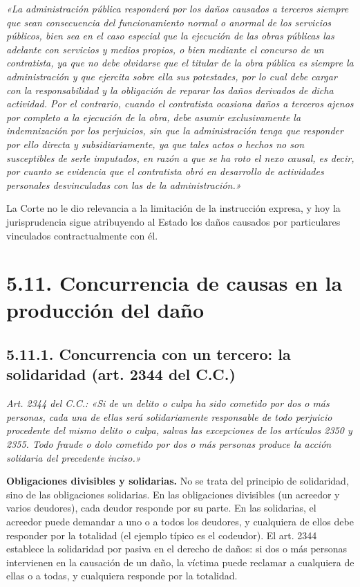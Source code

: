 \begin{cita}
\textit{«La administración pública responderá por los daños causados a terceros siempre que sean consecuencia del funcionamiento normal o anormal de los servicios públicos, bien sea en el caso especial que la ejecución de las obras públicas las adelante con servicios y medios propios, o bien mediante el concurso de un contratista, ya que no debe olvidarse que el titular de la obra pública es siempre la administración y que ejercita sobre ella sus potestades, por lo cual debe cargar con la responsabilidad y la obligación de reparar los daños derivados de dicha actividad. Por el contrario, cuando el contratista ocasiona daños a terceros ajenos por completo a la ejecución de la obra, debe asumir exclusivamente la indemnización por los perjuicios, sin que la administración tenga que responder por ello directa y subsidiariamente, ya que tales actos o hechos no son susceptibles de serle imputados, en razón a que se ha roto el nexo causal, es decir, por cuanto se evidencia que el contratista obró en desarrollo de actividades personales desvinculadas con las de la administración.»}
\end{cita}
La Corte no le dio relevancia a la limitación de la instrucción expresa, y hoy la jurisprudencia sigue atribuyendo al Estado los daños causados por particulares vinculados contractualmente con él.

\section{5.11. Concurrencia de causas en la producción del daño}
\subsection{5.11.1. Concurrencia con un tercero: la solidaridad (art. 2344 del C.C.)}
\begin{cita}
\textit{Art. 2344 del C.C.: «Si de un delito o culpa ha sido cometido por dos o más personas, cada una de ellas será solidariamente responsable de todo perjuicio procedente del mismo delito o culpa, salvas las excepciones de los artículos 2350 y 2355. Todo fraude o dolo cometido por dos o más personas produce la acción solidaria del precedente inciso.»}
\end{cita}
\textbf{Obligaciones divisibles y solidarias.} No se trata del principio de solidaridad, sino de las obligaciones solidarias. En las obligaciones divisibles (un acreedor y varios deudores), cada deudor responde por su parte. En las solidarias, el acreedor puede demandar a uno o a todos los deudores, y cualquiera de ellos debe responder por la totalidad (el ejemplo típico es el codeudor). El art. 2344 establece la solidaridad por pasiva en el derecho de daños: si dos o más personas intervienen en la causación de un daño, la víctima puede reclamar a cualquiera de ellas o a todas, y cualquiera responde por la totalidad.

